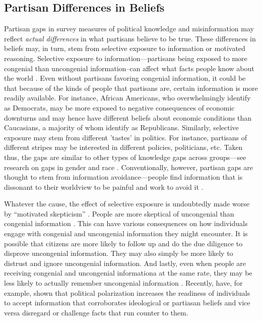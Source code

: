 \documentclass[12pt, letterpaper]{article}
\begin{document}
\subsection*{Partisan Differences in Beliefs}
Partisan gaps in survey measures of political knowledge and misinformation may reflect \emph{actual differences} in what partisans believe to be true. These differences in beliefs may, in turn, stem from selective exposure to information or motivated reasoning. Selective exposure to information---partisans being exposed to more congenial than uncongenial information--can affect what facts people know about the world \citep{stroud_2010}. Even without partisans favoring congenial information, it could be that because of the kinds of people that partisans are, certain information is more readily available. For instance, African Americans, who overwhelmingly identify as Democrats, may be more exposed to negative consequences of economic downturns and may hence have different beliefs about economic conditions than Caucasians, a majority of whom identify as Republicans. Similarly, selective exposure may stem from different 'tastes' in politics. For instance, partisans of different stripes may be interested in different policies, politicians, etc. Taken thus, the gaps are similar to other types of knowledge gaps across groups---see research on gaps in gender \citep{dolan2011women, barabas2014question} and race \citep{abrajano2015reexamining}. Conventionally, however, partisan gaps are thought to stem from information avoidance---people find information that is dissonant to their worldview to be painful and work to avoid it  \citep[e.g.,][]{abelson1959modes,festinger1962theory}.

Whatever the cause, the effect of selective exposure is undoubtedly made worse by ``motivated skepticism'' \citep{taber2006, stroud2008media}. People are more skeptical of uncongenial than congenial information \citep{Zaller1992}. This can have various consequences on how individuals engage with congenial and uncongenial information they might encounter. It is possible that citizens are more likely to follow up and do the due diligence to disprove uncongenial information. They may also simply be more likely to distrust and ignore uncongenial information. And lastly, even when people are receiving congenial and uncongenial informationa at the same rate, they may be less likely to actually remember uncongenial information \citep[see, for example][]{bayes2020and,hill2017learning,flynn2017nature, taber2006}. Recently,  \citet{peterson2021partisan} have, for example, shown that political polarization increases the readiness of individuals to accept information that corroborates ideological or partiasan beliefs and vice versa disregard or challenge facts that run counter to them.
\end{document}
